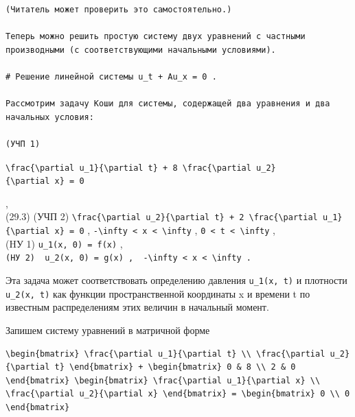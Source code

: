\documentclass[
  ukrainian,
]{article}
\begin{document}
\begin{verbatim}
(Читатель может проверить это самостоятельно.)

Теперь можно решить простую систему двух уравнений с частными производными (с соответствующими начальными условиями).

# Решение линейной системы u_t + Au_x = 0 .

Рассмотрим задачу Коши для системы, содержащей два уравнения и два начальных условия:

(УЧП 1)
\end{verbatim}

\texttt{\textbackslash{}frac\{\textbackslash{}partial\ u\_1\}\{\textbackslash{}partial\ t\}\ +\ 8\ \textbackslash{}frac\{\textbackslash{}partial\ u\_2\}\{\textbackslash{}partial\ x\}\ =\ 0}

,\\
(29.3) (УЧП 2)
\texttt{\textbackslash{}frac\{\textbackslash{}partial\ u\_2\}\{\textbackslash{}partial\ t\}\ +\ 2\ \textbackslash{}frac\{\textbackslash{}partial\ u\_1\}\{\textbackslash{}partial\ x\}\ =\ 0}
,
\texttt{-\textbackslash{}infty\ \textless{}\ x\ \textless{}\ \textbackslash{}infty}
, \texttt{0\ \textless{}\ t\ \textless{}\ \textbackslash{}infty} ,\\
(HУ 1) \texttt{u\_1(x,\ 0)\ =\ f(x)} ,\\
\texttt{(HУ\ 2)\ \ \textquotesingle{}u\_2(x,\ 0)\ =\ g(x)\textquotesingle{}\ ,\ \ \textquotesingle{}-\textbackslash{}infty\ \textless{}\ x\ \textless{}\ \textbackslash{}infty\textquotesingle{}\ .}

Эта задача может соответствовать определению давления
\texttt{u\_1(x,\ t)} и плотности \texttt{u\_2(x,\ t)} как функции
пространственной координаты x и времени t по известным распределениям
этих величин в начальный момент.

Запишем систему уравнений в матричной форме

\begin{verbatim}
\begin{bmatrix} \frac{\partial u_1}{\partial t} \\ \frac{\partial u_2}{\partial t} \end{bmatrix} + \begin{bmatrix} 0 & 8 \\ 2 & 0 \end{bmatrix} \begin{bmatrix} \frac{\partial u_1}{\partial x} \\ \frac{\partial u_2}{\partial x} \end{bmatrix} = \begin{bmatrix} 0 \\ 0 \end{bmatrix}
\end{verbatim}
\end{document}
